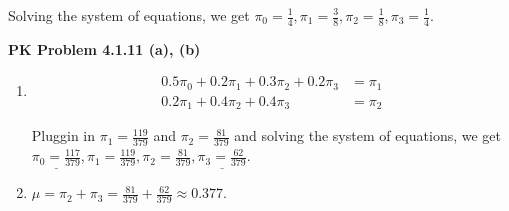 \documentclass{article}
\begin{document}
Solving the system of equations, we get $\pi_0 = \frac{1}{4}, \pi_1 = \frac{3}{8}, \pi_2 = \frac{1}{8}, \pi_3 = \frac{1}{4}$.
\bigbreak

\textbf{PK Problem 4.1.11 (a), (b)}
\begin{enumerate}[label={(\alph*)}]
    \item 
    \begin{align*}
        0.5\pi_0 + 0.2\pi_1 + 0.3\pi_2 +0.2\pi_3 & = \pi_1 \\
        0.2\pi_1 + 0.4\pi_2 +0.4\pi_3 & = \pi_2
    \end{align*}

    Pluggin in $\pi_1 = \frac{119}{379}$ and $\pi_2 = \frac{81}{379}$ and solving the system of equations, 
    we get $\underline{\pi_0 = \frac{117}{379}}, \pi_1 = \frac{119}{379}, \pi_2 = \frac{81}{379}, \underline{\pi_3 = \frac{62}{379}}$.

    \item 
    $\mu = \pi_2 + \pi_3 = \frac{81}{379} + \frac{62}{379} \approx 0.377.$
\end{enumerate}
\bigbreak
\end{document}

